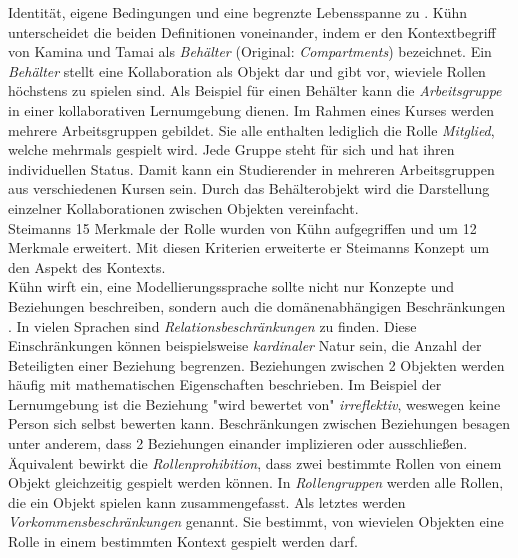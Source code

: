 \documentclass[conference]{IEEEtran}
\begin{document}
Identität, eigene Bedingungen und eine begrenzte Lebensspanne zu \cite{kamina2005selective}. Kühn unterscheidet die beiden Definitionen voneinander, indem er den Kontextbegriff von Kamina und Tamai als \textit{Behälter} (Original: \textit{Compartments}) bezeichnet. Ein \textit{Behälter} stellt eine Kollaboration als Objekt dar und gibt vor, wieviele Rollen höchstens zu spielen sind. Als Beispiel für einen Behälter kann die \textit{Arbeitsgruppe} in einer kollaborativen Lernumgebung dienen. Im Rahmen eines Kurses werden mehrere Arbeitsgruppen gebildet. Sie alle enthalten lediglich die Rolle \textit{Mitglied}, welche mehrmals gespielt wird. Jede Gruppe steht für sich und hat ihren individuellen Status. Damit kann ein Studierender in mehreren Arbeitsgruppen aus verschiedenen Kursen sein. Durch das Behälterobjekt wird die Darstellung einzelner Kollaborationen zwischen Objekten vereinfacht. \\ Steimanns 15 Merkmale \cite{steimann2000representation}der Rolle wurden von Kühn aufgegriffen und um 12 Merkmale erweitert. Mit diesen Kriterien erweiterte er Steimanns Konzept um den Aspekt des Kontexts.
\\ Kühn wirft ein, eine Modellierungssprache sollte nicht nur Konzepte und Beziehungen beschreiben, sondern auch die domänenabhängigen Beschränkungen \cite{family}. In vielen Sprachen sind \textit{Relationsbeschränkungen} zu finden. Diese Einschränkungen können beispielsweise \textit{kardinaler} Natur sein, die Anzahl der Beteiligten einer Beziehung begrenzen. Beziehungen zwischen 2 Objekten werden häufig mit mathematischen Eigenschaften beschrieben. Im Beispiel der Lernumgebung ist die Beziehung "wird bewertet von" \textit{irreflektiv}, weswegen keine Person sich selbst bewerten kann. Beschränkungen zwischen Beziehungen besagen unter anderem, dass 2 Beziehungen einander implizieren oder ausschließen. Äquivalent bewirkt die \textit{Rollenprohibition}, dass zwei bestimmte Rollen von einem Objekt gleichzeitig gespielt werden können. In \textit{Rollengruppen} werden alle Rollen, die ein Objekt spielen kann zusammengefasst. Als letztes werden \textit{Vorkommensbeschränkungen} genannt. Sie bestimmt, von wievielen Objekten eine Rolle in einem bestimmten Kontext gespielt werden darf.\\ 
\end{document}
